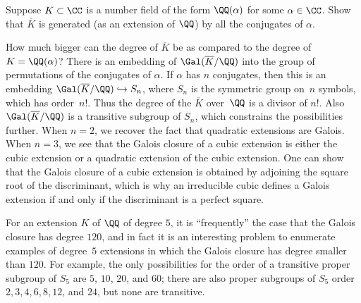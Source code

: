 \begin{exercise}
  Suppose $K \subset \CC$ is a number field of the form $\QQ(\alpha)$ for some
  $\alpha \in \CC$. Show that $\overline{K}$ is generated (as an extension of $\QQ$)
  by all the conjugates of $\alpha$.
\end{exercise}

How much bigger can the degree of $\overline{K}$ be as compared to the
degree of $K=\QQ(\alpha)$? There is an embedding of $\Gal(\overline{K}/\QQ)$
into the group of permutations of the conjugates of $\alpha$.
If $\alpha$ has $n$ conjugates, then this is an embedding
$\Gal(\overline{K}/\QQ) \hookrightarrow S_n$, where $S_n$ is the symmetric group on~$n$
symbols, which has order~$n!$. Thus the degree of the $\overline{K}$ over~$\QQ$
is a divisor of $n!$. Also $\Gal(\overline{K}/\QQ)$ is a transitive
subgroup of $S_n$, which constrains the possibilities further.
When $n=2$, we recover the fact that quadratic extensions are Galois.
When $n=3$, we see that the Galois closure of a cubic extension is either
the cubic extension or a quadratic extension of the cubic extension.
One can show that the Galois closure of a cubic extension is obtained
by adjoining the square root of the discriminant, which is why an
irreducible cubic defines a Galois extension if and only if the discriminant
is a perfect square.

For an extension $K$ of $\QQ$ of degree $5$, it is ``frequently'' the case that
the Galois closure has degree $120$, and in fact it is an interesting problem
to enumerate examples of degree~$5$ extensions in which the Galois closure
has degree smaller than $120$. For example, the only possibilities for the
order of a transitive proper subgroup of $S_5$ are $5$, $10$, $20$, and $60$;
there are also proper subgroups of $S_5$ order $2, 3, 4, 6, 8, 12$, and $24$,
but none are transitive.

